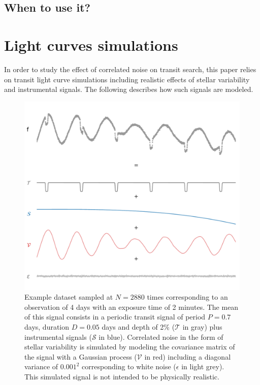 \documentclass{aastex631}
\begin{document}
\subsection{When to use it?}\label{when}


\newpage
\appendix
\section{Light curves simulations}\label{signals_simulations}

In order to study the effect of correlated noise on transit search, this paper relies on transit light curve simulations including realistic effects of stellar variability and instrumental signals. The following describes how such signals are modeled.
\begin{figure}[H]
    \begin{centering}
        \includegraphics[width=0.75\linewidth]{principle_dataset_decomposed.pdf}
        \caption{Example dataset sampled at $N=2880$ times corresponding to an observation of 4 days with an exposure time of 2 minutes. The mean of this signal consists in a periodic transit signal of period $P=0.7$ days, duration $D=0.05$ days and depth of 2\% ($\mathcal{T}$ in gray) plus instrumental signals ($\mathcal{S}$ in blue). Correlated noise in the form of stellar variability is simulated by modeling the covariance matrix of the signal with a Gaussian process ($\mathcal{V}$ in red) including a diagonal variance of $0.001^2$ corresponding to white noise ($\epsilon$ in light grey). This simulated signal is not intended to be physically realistic.}
        \label{fig:app_principle_dataset}
    \end{centering}
\end{figure}
\end{document}
